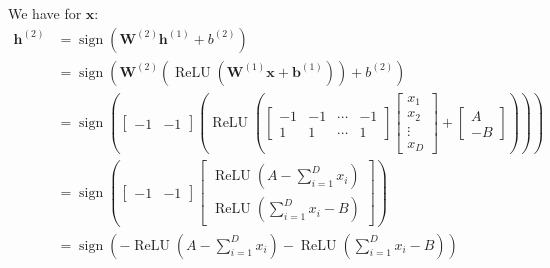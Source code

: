 \documentclass[11pt]{article}
\DeclareMathOperator{\relu}{ReLU}
\DeclareMathOperator{\sign}{sign}
\begin{document}
We have for $\bm{x}$:
\begin{align*}
  \bm{h}^{(2)} &= \sign \left( \bm{W}^{(2)}\bm{h}^{(1)} + b^{(2)} \right) \\
               &= \sign \left( \bm{W}^{(2)} \left( \relu \left( \bm{W}^{(1)} \bm{x} + \bm{b}^{(1)} \right) \right) + b^{(2)} \right) \\
               &= \sign \left( \begin{bmatrix}
                                       -1  &-1
                               \end{bmatrix} \left( \relu \left( \begin{bmatrix}
                                                                               -1  &-1  &\cdots &-1 \\
                                                                               1 &1 &\cdots &1
                                                                             \end{bmatrix}
                 \begin{bmatrix}
                   x_{1} \\
                   x_{2} \\
                   \vdots \\
                   x_{D}
                 \end{bmatrix} + \begin{bmatrix}
                                   A \\
                                   -B
                                 \end{bmatrix} \right) \right) \right) \\
               &= \sign \left( \begin{bmatrix}
                                       -1  &-1
                                     \end{bmatrix} \begin{bmatrix}
                                                     \relu \left( A - \sum_{i = 1}^{D} x_{i} \right) \\
                                                     \relu \left( \sum_{i = 1}^{D} x_{i} - B \right)
                                                   \end{bmatrix} \right) \\
               &= \sign \left( - \relu \left( A - \sum_{i = 1}^{D} x_{i} \right) - \relu \left( \sum_{i = 1}^{D} x_{i}  - B \right) \right)
\end{align*}
\end{document}
